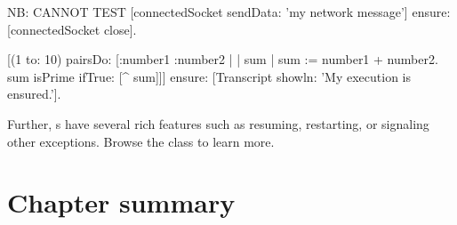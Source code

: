 \documentclass[a4paper,10pt,twoside]{book}
\begin{document}
\begin{code}{NB: CANNOT TEST}
[connectedSocket sendData: 'my network message'] 
   ensure: [connectedSocket close].

[(1 to: 10) pairsDo: [:number1 :number2 | | sum |
	sum := number1 + number2.
	sum isPrime ifTrue: [^ sum]]]
		ensure: [Transcript showln: 'My execution is ensured.'].
\end{code}


Further, s have several rich features such as resuming, restarting, or signaling other exceptions. 
Browse the class  to learn more.


\section{Chapter summary}
\end{document}
